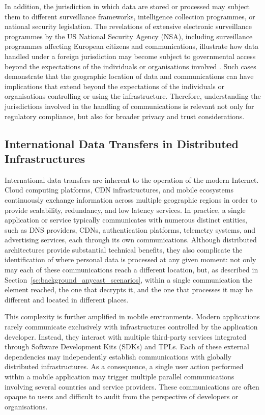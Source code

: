 In addition, the jurisdiction in which data are stored or processed may subject them to different surveillance frameworks, intelligence collection programmes, or national security legislation. The revelations of extensive electronic surveillance programmes by the US National Security Agency (NSA), including surveillance programmes affecting European citizens and communications, illustrate how data handled under a foreign jurisdiction may become subject to governmental access beyond the expectations of the individuals or organisations involved \cite{Texts2014}. Such cases demonstrate that the geographic location of data and communications can have implications that extend beyond the expectations of the individuals or organisations controlling or using the infrastructure. Therefore, understanding the jurisdictions involved in the handling of communications is relevant not only for regulatory compliance, but also for broader privacy and trust considerations.

\subsection{International Data Transfers in Distributed Infrastructures}
\label{sc:background_privacy_international_data_transfers}

International data transfers are inherent to the operation of the modern Internet. Cloud computing platforms, CDN infrastructures, and mobile ecosystems continuously exchange information across multiple geographic regions in order to provide scalability, redundancy, and low latency services. In practice, a single application or service typically communicates with numerous distinct entities, such as DNS providers, CDNs, authentication platforms, telemetry systems, and advertising services, each through its own communications. Although distributed architectures provide substantial technical benefits, they also complicate the identification of where personal data is processed at any given moment: not only may each of these communications reach a different location, but, as described in Section~\ref{sc:background_anycast_scenarios}, within a single communication the element reached, the one that decrypts it, and the one that processes it may be different and located in different places.

This complexity is further amplified in mobile environments. Modern applications rarely communicate exclusively with infrastructures controlled by the application developer. Instead, they interact with multiple third-party services integrated through Software Development Kits (SDKs) and TPLs. Each of these external dependencies may independently establish communications with globally distributed infrastructures. As a consequence, a single user action performed within a mobile application may trigger multiple parallel communications involving several countries and service providers. These communications are often opaque to users and difficult to audit from the perspective of developers or organisations.

